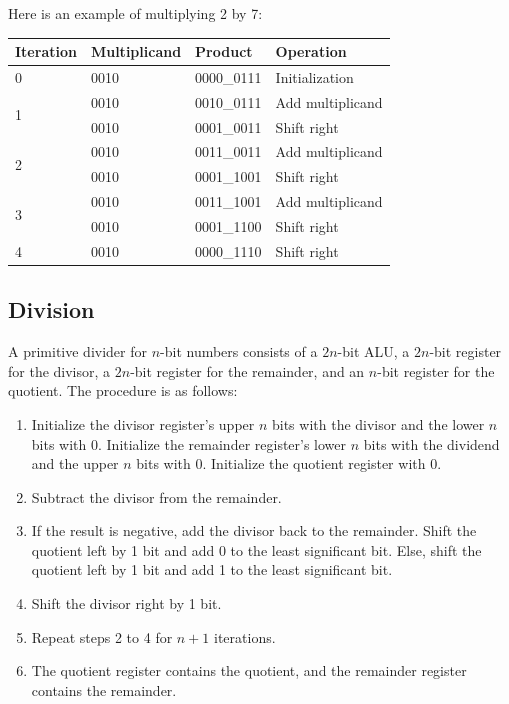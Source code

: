 \documentclass[a4paper,12pt]{article}
\begin{document}
Here is an example of multiplying 2 by 7:
\begin{table}[H]
	\centering
	\begin{tabular}{llll}
		\toprule
		\textbf{Iteration} & \textbf{Multiplicand} & \textbf{Product} & \textbf{Operation} \\
		\midrule
		0 & 0010 & 0000\_0111 & Initialization \\
		\midrule
		\multirow{2}{*}{1} & 0010 & 0010\_0111 & Add multiplicand \\
		& 0010 & 0001\_0011 & Shift right \\
		\midrule
		\multirow{2}{*}{2} & 0010 & 0011\_0011 & Add multiplicand \\
		& 0010 & 0001\_1001 & Shift right \\
		\midrule
		\multirow{2}{*}{3} & 0010 & 0011\_1001 & Add multiplicand \\
		& 0010 & 0001\_1100 & Shift right \\
		\midrule
		4 & 0010 & 0000\_1110 & Shift right \\
		\bottomrule
	\end{tabular}
\end{table}

\subsection{Division}

A primitive divider for $n$-bit numbers consists of a $2n$-bit ALU, a $2n$-bit register for the divisor, a $2n$-bit register for the remainder, and an $n$-bit register for the quotient. The procedure is as follows:
\begin{enumerate}
	\item Initialize the divisor register's upper $n$ bits with the divisor and the lower $n$ bits with 0. Initialize the remainder register's lower $n$ bits with the dividend and the upper $n$ bits with 0. Initialize the quotient register with 0.
	\item Subtract the divisor from the remainder.
	\item If the result is negative, add the divisor back to the remainder. Shift the quotient left by 1 bit and add 0 to the least significant bit. Else, shift the quotient left by 1 bit and add 1 to the least significant bit.
	\item Shift the divisor right by 1 bit.
	\item Repeat steps 2 to 4 for $n+1$ iterations.
	\item The quotient register contains the quotient, and the remainder register contains the remainder.
\end{enumerate}
\end{document}
